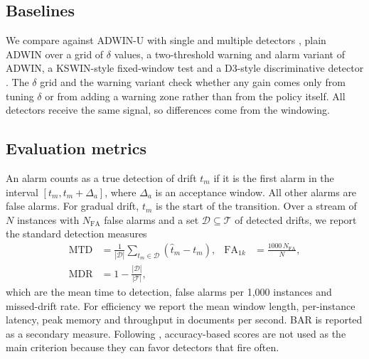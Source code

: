 \documentclass[conference]{IEEEtran}
\begin{document}
\subsection{Baselines}
We compare against ADWIN-U with single and multiple detectors \cite{assis2025}, plain ADWIN over a grid of $\delta$ values, a two-threshold warning and alarm variant of ADWIN, a KSWIN-style fixed-window test \cite{raab2020} and a D3-style discriminative detector \cite{gozuacik2019}. The $\delta$ grid and the warning variant check whether any gain comes only from tuning $\delta$ or from adding a warning zone rather than from the policy itself. All detectors receive the same signal, so differences come from the windowing.

\subsection{Evaluation metrics}
\label{sec:metrics}
An alarm counts as a true detection of drift $t_m$ if it is the first alarm in the interval $[t_m,t_m+\Delta_a]$, where $\Delta_a$ is an acceptance window. All other alarms are false alarms. For gradual drift, $t_m$ is the start of the transition. Over a stream of $N$ instances with $N_{\mathrm{FA}}$ false alarms and a set $\mathcal{D}\subseteq\mathcal{T}$ of detected drifts, we report the standard detection measures \cite{gama2014,bifet2017}
\begin{align}
\mathrm{MTD}&=\frac{1}{|\mathcal{D}|}\sum_{t_m\in\mathcal{D}}(\hat t_m-t_m), &
\mathrm{FA}_{1k}&=\frac{1000\,N_{\mathrm{FA}}}{N}, \nonumber\\
\mathrm{MDR}&=1-\frac{|\mathcal{D}|}{|\mathcal{T}|}, &&
\end{align}
which are the mean time to detection, false alarms per 1,000 instances and missed-drift rate. For efficiency we report the mean window length, per-instance latency, peak memory and throughput in documents per second. BAR \cite{assis2025} is reported as a secondary measure. Following \cite{lukats2025}, accuracy-based scores are not used as the main criterion because they can favor detectors that fire often.
\end{document}
